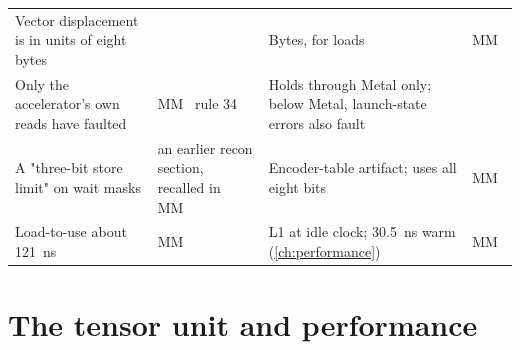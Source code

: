 \begin{xltabular}{\linewidth}{@{}>{\hsize}X>{\hsize}X>{\hsize}X>{\hsize}X@{}}
Vector displacement is in units of eight bytes &  & Bytes, for loads & MM~ \\
Only the accelerator's own reads have faulted & MM~ rule 34 & Holds through Metal only; below Metal, launch-state errors also fault &  \\
A "three-bit store limit" on wait masks & an earlier recon section, recalled in MM~ & Encoder-table artifact;  uses all eight
bits & MM~ \\
Load-to-use about 121~ns & MM~ & L1 at idle clock; 30.5~ns warm (\cref{ch:performance}) & MM~ \\
\bottomrule
\end{xltabular}

\section{The tensor unit and performance}\label{sec:tensor-unit-performance-2}

